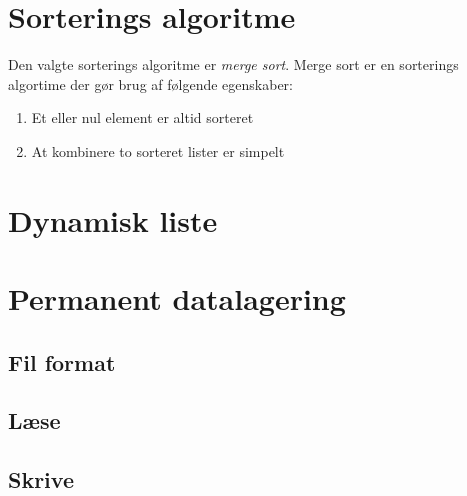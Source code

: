 \documentclass{article}
\begin{document}
\section{Sorterings algoritme}
Den valgte sorterings algoritme er \textit{merge sort}. Merge sort er en
sorterings algortime der g{\o}r brug af f{\o}lgende egenskaber:
\begin{enumerate}
	\item Et eller nul element er altid sorteret
	\item At kombinere to sorteret lister er simpelt
\end{enumerate}
\section{Dynamisk liste}
\section{Permanent datalagering}
\subsection{Fil format}
\subsection{L{\ae}se}
\subsection{Skrive}
\end{document}

